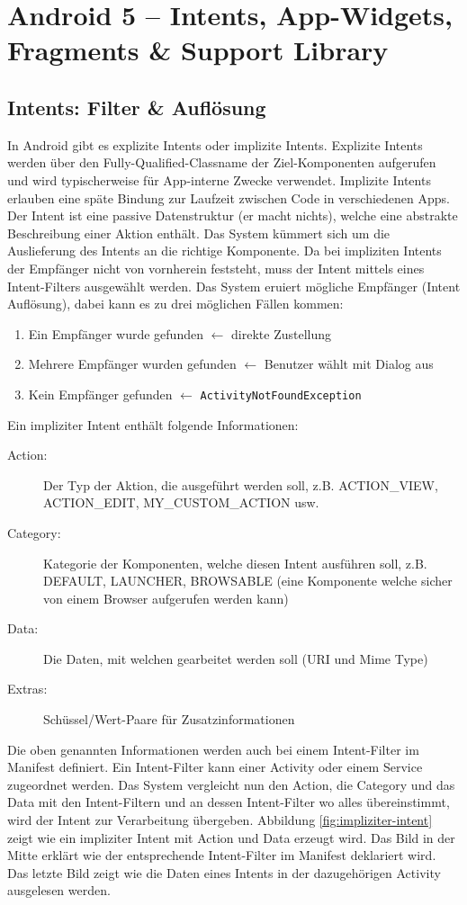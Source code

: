 \chapter{Android 5 – Intents, App-Widgets, Fragments \& Support Library}

\section{Intents: Filter \& Auflösung}

In Android gibt es explizite Intents oder implizite Intents. Explizite Intents werden über den Fully-Qualified-Classname der Ziel-Komponenten aufgerufen und wird typischerweise für App-interne Zwecke verwendet. Implizite Intents erlauben eine späte Bindung zur Laufzeit zwischen Code in verschiedenen Apps. Der Intent ist eine passive Datenstruktur (er macht nichts), welche eine abstrakte Beschreibung einer Aktion enthält. Das System kümmert sich um die Auslieferung des Intents an die richtige Komponente.
Da bei impliziten Intents der Empfänger nicht von vornherein feststeht, muss der Intent mittels eines Intent-Filters ausgewählt werden. Das System eruiert mögliche Empfänger (Intent Auflösung), dabei kann es zu drei möglichen Fällen kommen:
\begin{enumerate}
	\item Ein Empfänger wurde gefunden $\leftarrow$ direkte Zustellung
	\item Mehrere Empfänger wurden gefunden $\leftarrow$ Benutzer wählt mit Dialog aus
	\item Kein Empfänger gefunden $\leftarrow$ \texttt{ActivityNotFoundException}
\end{enumerate}
Ein impliziter Intent enthält folgende Informationen:
\begin{description}
	\item[Action:] Der Typ der Aktion, die ausgeführt werden soll, z.B. ACTION\_VIEW, ACTION\_EDIT, MY\_CUSTOM\_ACTION usw.
	\item[Category:] Kategorie der Komponenten, welche diesen Intent ausführen soll, z.B. DEFAULT, LAUNCHER, BROWSABLE (eine Komponente welche sicher von einem Browser aufgerufen werden kann)
	\item[Data:] Die Daten, mit welchen gearbeitet werden soll (URI und Mime Type)
	\item[Extras:] Schüssel/Wert-Paare für Zusatzinformationen
\end{description}
Die oben genannten Informationen werden auch bei einem Intent-Filter im Manifest definiert. Ein Intent-Filter kann einer Activity oder einem Service zugeordnet werden. Das System vergleicht nun den Action, die Category und das Data mit den Intent-Filtern und an dessen Intent-Filter wo alles übereinstimmt, wird der Intent zur Verarbeitung übergeben. Abbildung \ref{fig:impliziter-intent} zeigt wie ein impliziter Intent mit Action und Data erzeugt wird. Das Bild in der Mitte erklärt wie der entsprechende Intent-Filter im Manifest deklariert wird. Das letzte Bild zeigt wie die Daten eines Intents in der dazugehörigen Activity ausgelesen werden.
